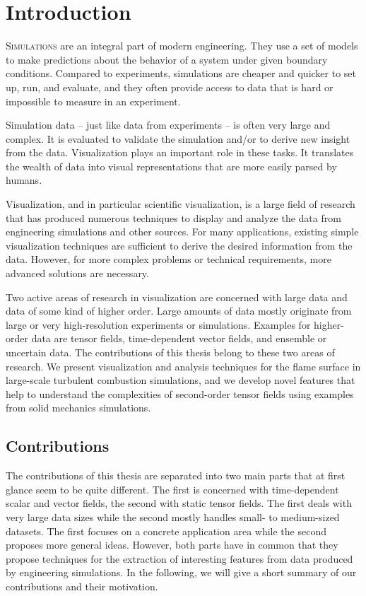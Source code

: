 \chapter{Introduction} %
\label{cha:introduction}
%
\vspace{-\baselineskip}%
\lettrine[findent=-3.5pt, nindent=4pt, loversize=0.015,
lhang=0.08]{S}{imulations} are an integral part of modern engineering.
%
They use a set of models to make predictions about the behavior of a system
under given boundary conditions.
%
Compared to experiments, simulations are cheaper and quicker to set up, run, and
evaluate, and they often provide access to data that is hard or impossible to
measure in an experiment.
%

%
Simulation data -- just like data from experiments -- is often very large and
complex.
%
It is evaluated to validate the simulation and/or to derive new insight from
the data.
%
Visualization plays an important role in these tasks.
%
It translates the wealth of data into visual representations that are more
easily parsed by humans.
%

%
Visualization, and in particular scientific visualization, is a large field of
research that has produced numerous techniques to display and analyze the data
from engineering simulations and other sources.
%
For many applications, existing simple visualization techniques are sufficient
to derive the desired information from the data.
%
However, for more complex problems or technical requirements, more advanced
solutions are necessary.
%

%
Two active areas of research in visualization are concerned with large data and
data of some kind of higher order.
%
Large amounts of data mostly originate from large or very high-resolution
experiments or simulations.
%
Examples for higher-order data are tensor fields, time-dependent vector fields,
and ensemble or uncertain data.
%
The contributions of this thesis belong to these two areas of research.
%
We present visualization and analysis techniques for the flame surface in
large-scale turbulent combustion simulations, and we develop novel features
that help to understand the complexities of second-order tensor fields using
examples from solid mechanics simulations.
%
\section{Contributions} %
\label{sec:contributions}
%
The contributions of this thesis are separated into two main parts that at first
glance seem to be quite different.
%
The first is concerned with time-dependent scalar and vector fields, the second
with static tensor fields.
%
The first deals with very large data sizes while the second mostly handles
small- to medium-sized datasets.
%
The first focuses on a concrete application area while the second proposes more
general ideas.
%
However, both parts have in common that they propose techniques for the
extraction of interesting features from data produced by engineering
simulations.
%
In the following, we will give a short summary of our contributions and their
motivation.
%
